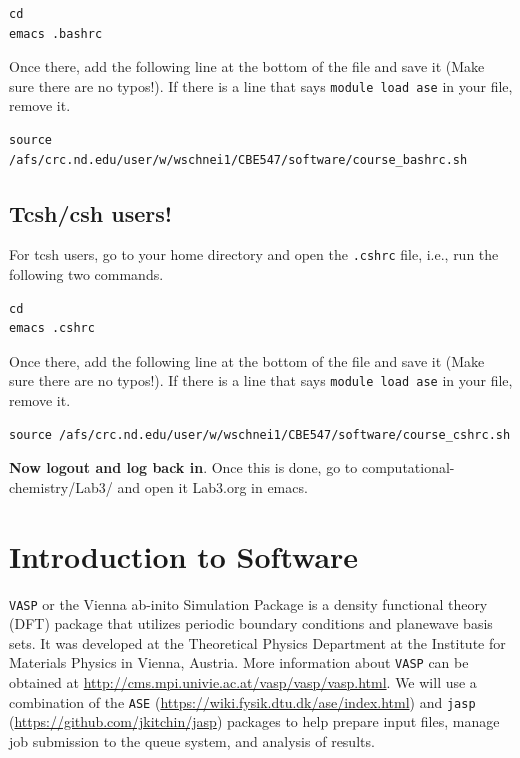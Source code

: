 \documentclass[11pt]{article}
\begin{document}
\begin{verbatim}
cd
emacs .bashrc
\end{verbatim}

Once there, add the following line at the bottom of the file and save it (Make sure there are no typos!). If there is a line that says \verb~module load ase~ in your file, remove it.

\begin{verbatim}
source /afs/crc.nd.edu/user/w/wschnei1/CBE547/software/course_bashrc.sh
\end{verbatim}

\subsection{Tcsh/csh users!}
\label{sec-2-2}

For tcsh users, go to your home directory and open the \texttt{.cshrc} file, i.e., run the following two commands.

\begin{verbatim}
cd
emacs .cshrc
\end{verbatim}

Once there, add the following line at the bottom of the file and save it (Make sure there are no typos!). If there is a line that says \verb~module load ase~ in your file, remove it.

\begin{verbatim}
source /afs/crc.nd.edu/user/w/wschnei1/CBE547/software/course_cshrc.sh
\end{verbatim}

\textbf{Now logout and log back in}. Once this is done, go to computational-chemistry/Lab3/ and open it Lab3.org in emacs.


\section{Introduction to Software}
\label{sec-3}

\texttt{VASP} or the Vienna ab-inito Simulation Package is a density functional theory (DFT) package that utilizes periodic boundary conditions and planewave basis sets. It was developed at the Theoretical Physics Department at the Institute for Materials Physics in Vienna, Austria. More information about \texttt{VASP} can be obtained at \url{http://cms.mpi.univie.ac.at/vasp/vasp/vasp.html}. We will use a combination of the \texttt{ASE} (\url{https://wiki.fysik.dtu.dk/ase/index.html}) and \texttt{jasp} (\url{https://github.com/jkitchin/jasp}) packages to help prepare input files, manage job submission to the queue system, and analysis of results.  
\end{document}
